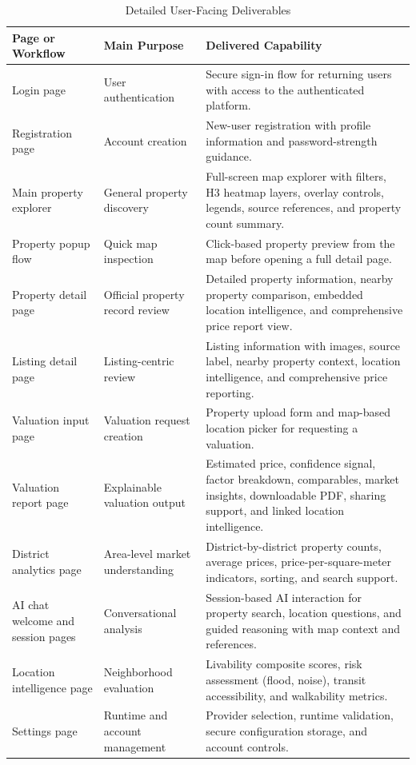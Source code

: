 \begin{table}[htbp]
    \centering
    \small
    \renewcommand{\arraystretch}{1.25}
    \begin{tabularx}{\textwidth}{>{\raggedright\arraybackslash}p{}>{\raggedright\arraybackslash}p{}>{\raggedright\arraybackslash}X}
        \toprule
        \rowcolor[gray]{0.9} \textbf{Page or Workflow} & \textbf{Main Purpose} & \textbf{Delivered Capability} \\
        \midrule
        Login page & User authentication & Secure sign-in flow for returning users with access to the authenticated platform. \\
        Registration page & Account creation & New-user registration with profile information and password-strength guidance. \\
        Main property explorer & General property discovery & Full-screen map explorer with filters, H3 heatmap layers, overlay controls, legends, source references, and property count summary. \\
        Property popup flow & Quick map inspection & Click-based property preview from the map before opening a full detail page. \\
        Property detail page & Official property record review & Detailed property information, nearby property comparison, embedded location intelligence, and comprehensive price report view. \\
        Listing detail page & Listing-centric review & Listing information with images, source label, nearby property context, location intelligence, and comprehensive price reporting. \\
        Valuation input page & Valuation request creation & Property upload form and map-based location picker for requesting a valuation. \\
        Valuation report page & Explainable valuation output & Estimated price, confidence signal, factor breakdown, comparables, market insights, downloadable PDF, sharing support, and linked location intelligence. \\
        District analytics page & Area-level market understanding & District-by-district property counts, average prices, price-per-square-meter indicators, sorting, and search support. \\
        AI chat welcome and session pages & Conversational analysis & Session-based AI interaction for property search, location questions, and guided reasoning with map context and references. \\
        Location intelligence page & Neighborhood evaluation & Livability composite scores, risk assessment (flood, noise), transit accessibility, and walkability metrics. \\
        Settings page & Runtime and account management & Provider selection, runtime validation, secure configuration storage, and account controls. \\
        \bottomrule
    \end{tabularx}
    \caption{Detailed User-Facing Deliverables}
    \label{tab:chapter7-user-facing-pages}
\end{table}

